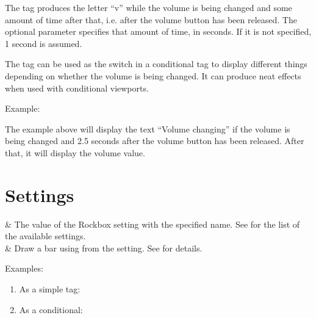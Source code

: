 The tag produces the letter ``v'' while the volume is being changed and some
amount of time after that, i.e. after the volume button has been released. The
optional parameter  specifies that amount of time, in seconds. If it
is not specified, 1 second is assumed.

The tag can be used as the switch in a conditional tag to display different things
depending on whether the volume is being changed. It can produce neat effects
when used with conditional viewports.

Example: 

The example above will display the text ``Volume changing'' if the volume is
being changed and 2.5 seconds after the volume button has been released. After
that, it will display the volume value.

\section{Settings}
  \begin{tagmap}
     & The value of the Rockbox
             setting with the specified name. See 
             for the list of the available settings.\\
     & Draw a bar using from the setting.
            See  for details.\\
  \end{tagmap}

Examples:
\begin{enumerate}
\item As a simple tag: 
\item As a conditional: 
\end{enumerate}

